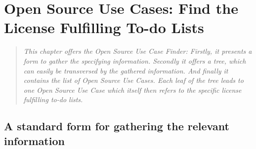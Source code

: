 %
%
%
%
%



\chapter{Open Source Use Cases: Find the License Fulfilling To-do Lists}\label{sec:OSUCfinder}

\footnotesize
\begin{quote}\itshape
This chapter offers the \emph{Open Source Use Case Finder}: Firstly, it presents
a form to gather the specifying information. Secondly it offers a tree, which
can easily be transversed by the gathered information. And finally it contains
the list of \emph{Open Source Use Cases}. Each leaf of the tree leads to one
\emph{Open Source Use Case} which itself then refers to the specific license
fulfilling to-do lists.
\end{quote}
\normalsize{}

\section{A standard form for gathering the relevant information}
\label{OSLiCStandardFormForGatheringInformation}
 
